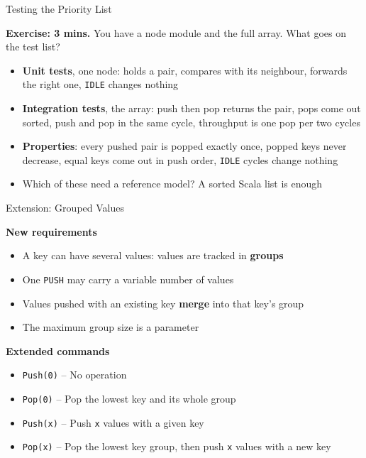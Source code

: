 \begin{frame}{Testing the Priority List}

	\textbf{Exercise: 3 mins.} You have a node module and the full array. What goes on the test list?
	\pause
	\begin{itemize}
		\item \textbf{Unit tests}, one node: holds a pair, compares with its neighbour, forwards the right one, \texttt{IDLE} changes nothing
		\item \textbf{Integration tests}, the array: push then pop returns the pair, pops come out sorted,
		      push and pop in the same cycle, throughput is one pop per two cycles
		\item \textbf{Properties}: every pushed pair is popped exactly once,
		      popped keys never decrease, equal keys come out in push order,
		      \texttt{IDLE} cycles change nothing
		\pause
		\item Which of these need a reference model? A sorted Scala list is enough
	\end{itemize}

\end{frame}

\begin{frame}{Extension: Grouped Values}

	\textbf{New requirements}
	\begin{itemize}
		\item A key can have several values: values are tracked in \textbf{groups}
		\item One \texttt{PUSH} may carry a variable number of values
		\item Values pushed with an existing key \textbf{merge} into that key's group
		\item The maximum group size is a parameter
	\end{itemize}

	\vspace{0.5em}
	\textbf{Extended commands}
	\begin{itemize}
		\item \texttt{Push(0)} -- No operation
		\item \texttt{Pop(0)} -- Pop the lowest key and its whole group
		\item \texttt{Push(x)} -- Push \texttt{x} values with a given key
		\item \texttt{Pop(x)} -- Pop the lowest key group, then push \texttt{x} values with a new key
	\end{itemize}

\end{frame}

